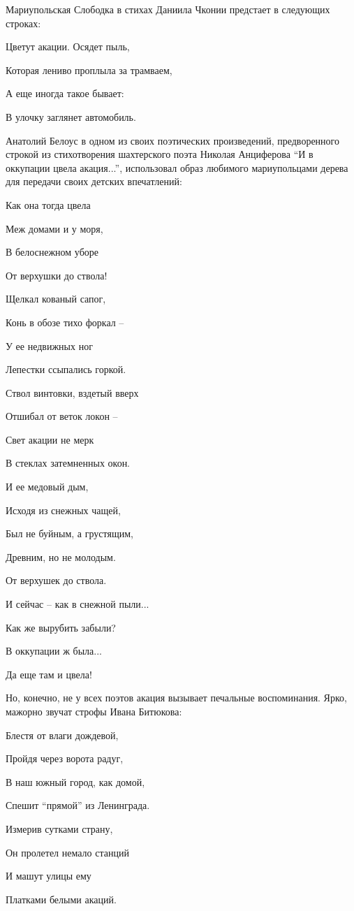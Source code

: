 Мариупольская Слободка в стихах Даниила Чконии предстает в следующих строках:

\begin{qqquote}
Цветут акации. Осядет пыль,

Которая лениво проплыла за трамваем,

А еще иногда такое бывает:

В улочку заглянет автомобиль.	
\end{qqquote}

Анатолий Белоус в одном из своих поэтических произведений, предворенного
строкой из стихотворения шахтерского поэта Николая Анциферова \enquote{И в оккупации
цвела акация...}, использовал образ любимого мариупольцами дерева для передачи
своих детских впечатлений:

\begin{qqquote}
Как она тогда цвела

Меж домами и у моря,

В белоснежном уборе

От верхушки до ствола!

Щелкал кованый сапог,

Конь в обозе тихо форкал –

У ее недвижных ног

Лепестки ссыпались горкой.

Ствол винтовки, вздетый вверх

Отшибал от веток локон –

Свет акации не мерк

В стеклах затемненных окон.

И ее медовый дым,

Исходя из снежных чащей,

Был не буйным, а грустящим,

Древним, но не молодым.

От верхушек до ствола.

И сейчас – как в снежной пыли...

Как же вырубить забыли?

В оккупации ж была...

Да еще там и цвела!	
\end{qqquote}

Но, конечно, не у всех поэтов акация вызывает печальные воспоминания. Ярко,
мажорно звучат строфы Ивана Битюкова:

\begin{qqquote}
Блестя от влаги дождевой,

Пройдя через ворота радуг,

В наш южный город, как домой,

Спешит \enquote{прямой} из Ленинграда.

Измерив сутками страну,

Он пролетел немало станций

И машут улицы ему

Платками белыми акаций.
\end{qqquote}

